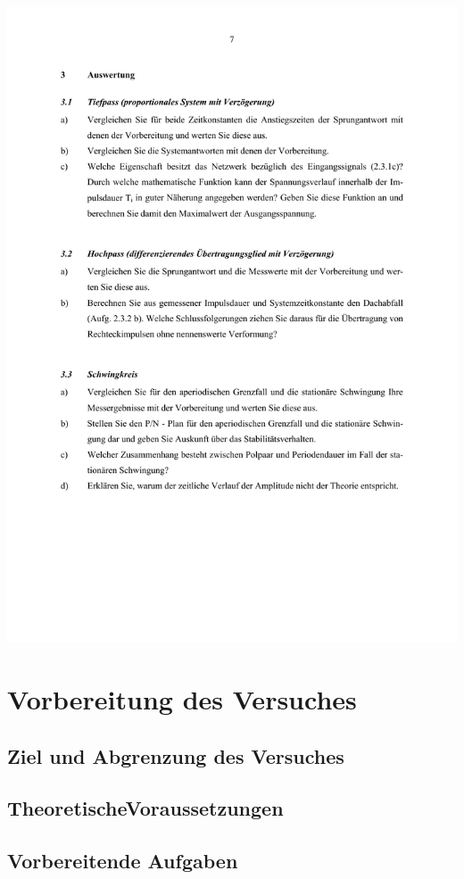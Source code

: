 \includegraphics[width=1.0\textwidth]{Bilder/Grundubertragungsglieder im Zeitbereich (verschoben) 7}\newpage


\section{Vorbereitung des Versuches}
\subsection{Ziel und Abgrenzung des Versuches}
\subsection{TheoretischeVoraussetzungen}
\subsection{Vorbereitende Aufgaben}
